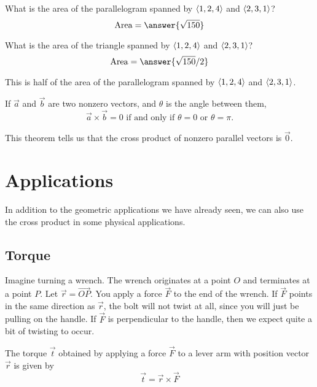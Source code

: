 \documentclass{ximera}
\begin{document}
\begin{question}
  What is the area of the parallelogram spanned by $\left\langle 1,2,4\right\rangle$ and $\left\langle 2,3,1\right\rangle$?
  \[
  \text{Area} = \answer{\sqrt{150}}
  \]
  \begin{question}
    What is the area of the triangle spanned by $\left\langle 1,2,4\right\rangle$ and $\left\langle 2,3,1\right\rangle$?
    \[
    \text{Area} = \answer{\sqrt{150}/2}
    \]
    \begin{hint}
      This is half of the area of the parallelogram spanned by $\left\langle 1,2,4\right\rangle$ and $\left\langle 2,3,1\right\rangle$.
    \end{hint}
  \end{question}
\end{question}



\begin{theorem}
  If $\vec{a}$ and $\vec{b}$ are two nonzero vectors, and $\theta$ is
  the angle between them,
  \[
  \vec{a}\times \vec{b} = 0 \text{ if and only if $\theta=
  0$ or $\theta=\pi$}.
  \]
\end{theorem}

This theorem tells us that the cross product of nonzero parallel
vectors is $\vec{0}$.




\section{Applications}

In addition to the geometric applications we have already seen, we can
also use the cross product in some physical applications.



\subsection{Torque}

Imagine turning a wrench.  The wrench originates at a point $O$ and
terminates at a point $P$.  Let $\vec{r} = \overrightarrow{OP}$.  You
apply a force $\vec{F}$ to the end of the wrench.  If $\vec{F}$ points
in the same direction as $\vec{r}$, the bolt will not twist at all,
since you will just be pulling on the handle.  If $\vec{F}$ is
perpendicular to the handle, then we expect quite a bit of twisting to
occur.

\begin{definition}
  The torque $\vec{t}$ obtained by applying a force $\vec{F}$ to a
  lever arm with position vector $\vec{r}$ is given by
  \[
  \vec{t} = \vec{r} \times \vec{F} 
  \]
\end{definition}
\end{document}
